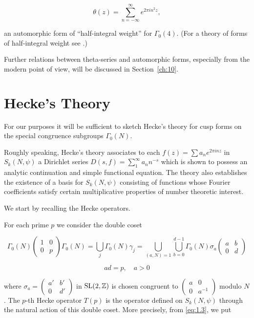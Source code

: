 \[
\theta(z) = \sum_{n=-\infty}^{\infty} e^{2\pi in^2 z},
\]

an automorphic form of ``half-integral weight'' for $\Gamma_0(4)$. (For a theory of forms of half-integral weight see \cite{Shimura2}.)

Further relations between theta-series and automorphic forms, especially from the modern point of view, will be discussed in Section~\ref{ch:10}.

\section{Hecke's Theory}\label{sec:1c}

For our purposes it will be sufficient to sketch Hecke's theory for cusp forms on the special congruence subgroups $\Gamma_0(N)$.

Roughly speaking, Hecke's theory associates to each $f(z) = \sum a_n e^{2\pi inz}$ in $S_k(N,\psi)$ a Dirichlet series $D(s,f) = \sum_{1}^{\infty} a_n n^{-s}$ which is shown to possess an analytic continuation and simple functional equation. The theory also establishes the existence of a basis for $S_k(N,\psi)$ consisting of functions whose Fourier coefficients satisfy certain multiplicative properties of number theoretic interest.

We start by recalling the Hecke operators.

For each prime $p$ we consider the double coset

\[
\Gamma_0(N) \begin{pmatrix} 1 & 0 \\ 0 & p \end{pmatrix} \Gamma_0(N) = \bigcup_j \Gamma_0(N) \gamma_j = \bigcup_{(a,N)=1} \bigcup_{b=0}^{d-1} \Gamma_0(N) \sigma_a \begin{pmatrix} a & b \\ 0 & d \end{pmatrix}
\]

\[
ad = p, \quad a > 0
\]

where $\sigma_a = \begin{pmatrix} a' & b' \\ 0 & d' \end{pmatrix}$ in $\operatorname{SL}(2,\mathbb{Z})$ is chosen congruent to $\begin{pmatrix} a & 0 \\ 0 & a^{-1} \end{pmatrix}$ modulo $N$. The $p$-th Hecke operator $T(p)$ is the operator defined on $S_k(N,\psi)$ through the natural action of this double coset. More precisely, from \eqref{eq:1.3}, we put

